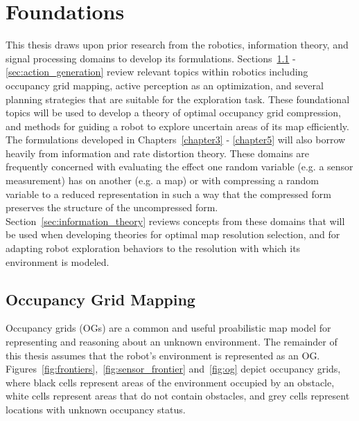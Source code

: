 \chapter{Foundations}
\label{chapter2}

This thesis draws upon prior research from the robotics, information theory, and signal
processing domains to develop its formulations.
Sections~\ref{sec:occ_grid_mapping} - \ref{sec:action_generation} review relevant topics within
robotics including occupancy grid mapping,
active perception as an optimization, and several planning strategies that are suitable for the
exploration task. These foundational topics will be used to develop a theory of
optimal occupancy grid compression, and methods for guiding a robot to explore
uncertain areas of its map efficiently. The formulations developed in
Chapters~\ref{chapter3} - \ref{chapter5} will also
borrow heavily from information and rate distortion theory. These
domains are frequently concerned with evaluating the effect one random
variable (e.g. a sensor measurement) has on
another (e.g. a map) or with compressing a random variable to a reduced
representation in such a way that the compressed form preserves the structure of the
uncompressed form.
Section~\ref{sec:information_theory} reviews concepts from
these domains that will be used when developing theories for optimal map resolution selection,
and for adapting robot exploration behaviors to the resolution with which its environment is
modeled.

\section{Occupancy Grid Mapping}
\label{sec:occ_grid_mapping}

Occupancy grids (OGs) are a common and useful proabilistic map model for representing and
reasoning about an unknown environment. The remainder of this
thesis assumes that the robot's environment is represented as an OG.
Figures~\ref{fig:frontiers},~\ref{fig:sensor_frontier} and~\ref{fig:og} depict occupancy grids,
where black cells represent areas of the environment occupied by an obstacle, white cells
represent areas that do not contain obstacles, and grey cells represent
locations with unknown occupancy status.

